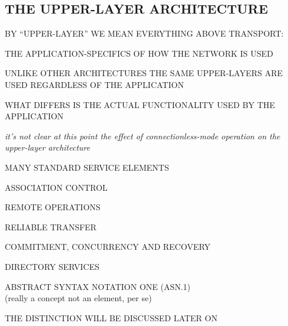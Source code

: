 \begin{bwslide}
\part*	{THE UPPER-LAYER ARCHITECTURE}\bf

\begin{nrtc}
\item	BY ``UPPER-LAYER'' WE MEAN EVERYTHING ABOVE TRANSPORT:
    \begin{nrtc}
    \item	THE APPLICATION-SPECIFICS OF HOW THE NETWORK IS USED
    \end{nrtc}

\item	UNLIKE OTHER ARCHITECTURES THE SAME UPPER-LAYERS ARE USED
	REGARDLESS OF THE APPLICATION

\item	WHAT DIFFERS IS THE ACTUAL FUNCTIONALITY USED BY THE APPLICATION
\end{nrtc}
\end{bwslide}


\begin{note}\em
it's not clear at this point the effect of connectionless-mode operation on
the upper-layer architecture
\end{note}




\begin{bwslide}

\begin{nrtc}
\item	MANY STANDARD SERVICE ELEMENTS
    \begin{nrtc}
    \item	ASSOCIATION CONTROL

    \item	REMOTE OPERATIONS

    \item	RELIABLE TRANSFER

    \item	COMMITMENT, CONCURRENCY AND RECOVERY

    \item	DIRECTORY SERVICES
    \end{nrtc}

\item	ABSTRACT SYNTAX NOTATION ONE (ASN.1)\\
	(really a concept not an element, per se)

\item	THE DISTINCTION WILL BE DISCUSSED LATER ON
\end{nrtc}
\end{bwslide}


